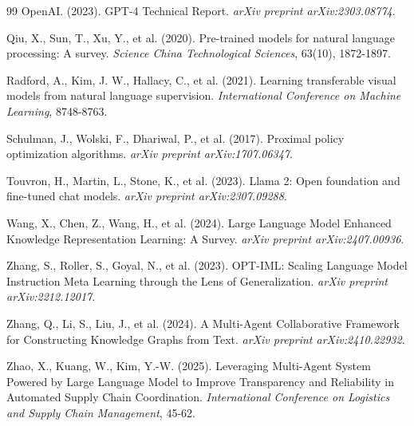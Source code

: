 \documentclass[11pt,a4paper]{article}
\begin{document}
\begin{thebibliography}{99}
OpenAI. (2023). 
GPT-4 Technical Report. 
\textit{arXiv preprint arXiv:2303.08774}.

Qiu, X., Sun, T., Xu, Y., et al. (2020). 
Pre-trained models for natural language processing: A survey. 
\textit{Science China Technological Sciences}, 63(10), 1872-1897.

Radford, A., Kim, J. W., Hallacy, C., et al. (2021). 
Learning transferable visual models from natural language supervision. 
\textit{International Conference on Machine Learning}, 8748-8763.

Schulman, J., Wolski, F., Dhariwal, P., et al. (2017). 
Proximal policy optimization algorithms. 
\textit{arXiv preprint arXiv:1707.06347}.

Touvron, H., Martin, L., Stone, K., et al. (2023). 
Llama 2: Open foundation and fine-tuned chat models. 
\textit{arXiv preprint arXiv:2307.09288}.

Wang, X., Chen, Z., Wang, H., et al. (2024). 
Large Language Model Enhanced Knowledge Representation Learning: A Survey. 
\textit{arXiv preprint arXiv:2407.00936}.

Zhang, S., Roller, S., Goyal, N., et al. (2023). 
OPT-IML: Scaling Language Model Instruction Meta Learning through the Lens of Generalization. 
\textit{arXiv preprint arXiv:2212.12017}.

Zhang, Q., Li, S., Liu, J., et al. (2024). 
A Multi-Agent Collaborative Framework for Constructing Knowledge Graphs from Text. 
\textit{arXiv preprint arXiv:2410.22932}.

Zhao, X., Kuang, W., Kim, Y.-W. (2025). 
Leveraging Multi-Agent System Powered by Large Language Model to Improve Transparency and Reliability in Automated Supply Chain Coordination. 
\textit{International Conference on Logistics and Supply Chain Management}, 45-62.

\end{thebibliography}
\end{document}
